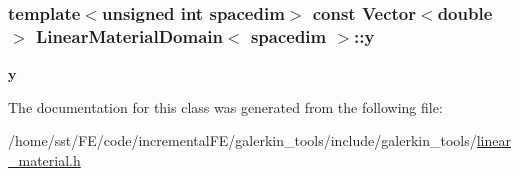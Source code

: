 \subsubsection[{\texorpdfstring{y}{y}}]{\setlength{\rightskip}{0pt plus 5cm}template$<$unsigned int spacedim$>$ const {\bf Vector}$<$double$>$ {\bf Linear\+Material\+Domain}$<$ spacedim $>$\+::y\hspace{0.3cm}{\ttfamily [private]}}\hypertarget{class_linear_material_domain_a7ea9ab6930c0b0aa826e809ef245b0e2}{}\label{class_linear_material_domain_a7ea9ab6930c0b0aa826e809ef245b0e2}
$\boldsymbol{y}$ 

The documentation for this class was generated from the following file\+:\begin{DoxyCompactItemize}
\item 
/home/sst/\+F\+E/code/incremental\+F\+E/galerkin\+\_\+tools/include/galerkin\+\_\+tools/\hyperlink{linear__material_8h}{linear\+\_\+material.\+h}\end{DoxyCompactItemize}
